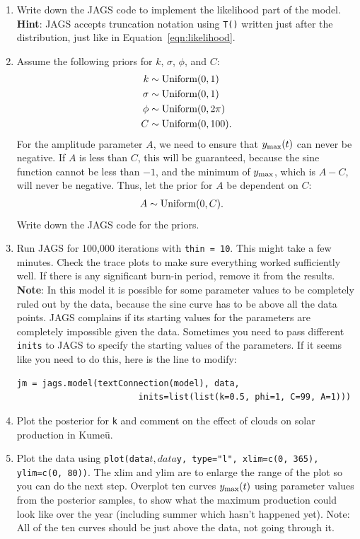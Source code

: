 \documentclass[12pt]{article}
\begin{document}
\begin{Questions}
\begin{enumerate}
\item [(a)] Write down the JAGS code to implement the likelihood part of
the model. {\bf Hint}: JAGS accepts truncation notation using \texttt{T()}
written just after the distribution, just like in Equation~\ref{eqn:likelihood}.
\item [(b)] Assume the following priors for $k$, $\sigma$, $\phi$, and $C$:
\begin{align}
k &\sim \textnormal{Uniform}(0, 1) \\
\sigma &\sim \textnormal{Uniform}(0, 1) \\
\phi &\sim \textnormal{Uniform}(0, 2\pi) \\
C &\sim \textnormal{Uniform}(0, 100).
\end{align}
For the amplitude parameter $A$, we need to ensure that $y_{\rm max}(t)$
can never be negative. If $A$ is less than $C$, this will be guaranteed,
because the sine function cannot be less than $-1$, and the minimum
of $y_{\rm max}$, which is $A - C$, will never
be negative.
Thus, let the prior for $A$ be dependent on $C$:
\begin{align}
A &\sim \textnormal{Uniform}(0, C).
\end{align}
Write down the JAGS code for the priors.
\item [(c)] Run JAGS for 100,000 iterations with \texttt{thin = 10}.
This might take a few minutes. Check the trace plots to make sure everything
worked sufficiently well. If there is any significant burn-in period, remove it
from the results.
{\bf Note}: In this model it is possible for some parameter values to be
completely ruled out by the data, because the sine curve has to be above all
the data points. JAGS complains if its starting values for the parameters
are completely impossible given the data. Sometimes you need to pass
different \texttt{inits} to JAGS to specify the starting values of
the parameters. If it seems like you need to do this, here is the line to
modify:
\begin{verbatim}
jm = jags.model(textConnection(model), data,
                        inits=list(list(k=0.5, phi=1, C=99, A=1)))
\end{verbatim}
\item[(d)] Plot the posterior for \texttt{k} and comment on the
effect of clouds on solar production in Kumeū.

\item [(e)] Plot the data using
\texttt{plot(data$t, data$y, type="l", xlim=c(0, 365), ylim=c(0, 80))}.
The xlim and ylim are to enlarge the range of the plot so you can do the
next step.
Overplot ten curves $y_{\rm max}(t)$ using parameter values from the
posterior samples, to show what the maximum production could look like over
the year (including summer which hasn't happened yet).
Note: All of the ten curves should be just
above the data, not going through it.


\end{enumerate}
\end{Questions}
\end{document}

